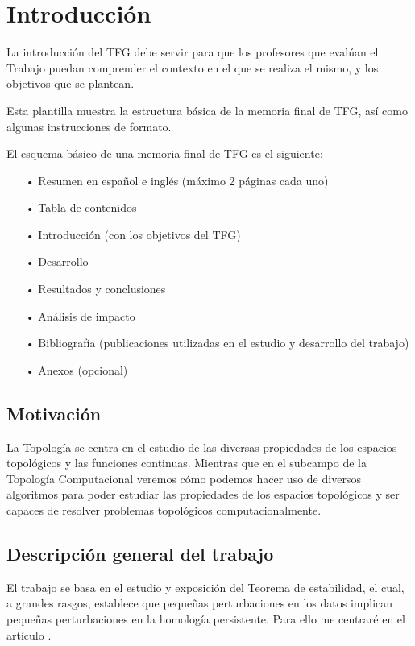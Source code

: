 \chapter{Introducción}
La introducción del TFG debe servir para que los profesores que evalúan el Trabajo puedan comprender el contexto en el que se realiza el mismo, y los objetivos que se plantean.

Esta plantilla muestra la estructura básica de la memoria final de TFG, así como algunas instrucciones de formato.

El esquema básico de una memoria final de TFG es el siguiente:
\begin{itemize}
\item[•] Resumen en español e inglés (máximo 2 páginas cada uno)
\item[•] Tabla de contenidos
\item[•] Introducción (con los objetivos del TFG)
\item[•] Desarrollo
\item[•] Resultados y conclusiones
\item[•] Análisis de impacto
\item[•] Bibliografía (publicaciones utilizadas en el estudio y desarrollo del trabajo)
\item[•] Anexos (opcional)
\end{itemize}


\section{Motivación}
La Topología se centra en el estudio de las diversas propiedades de los espacios topológicos y las funciones continuas. Mientras que en el subcampo de la Topología Computacional veremos cómo podemos hacer uso de diversos algoritmos para poder estudiar las propiedades de los espacios topológicos y ser capaces de resolver problemas topológicos computacionalmente.

\section{Descripción general del trabajo}
El trabajo se basa en el estudio y exposición del Teorema de estabilidad, el cual, a grandes rasgos, establece que pequeñas perturbaciones en los datos implican pequeñas perturbaciones en la homología persistente. Para ello me centraré en el artículo \cite{Cohen-Steiner2007}.

